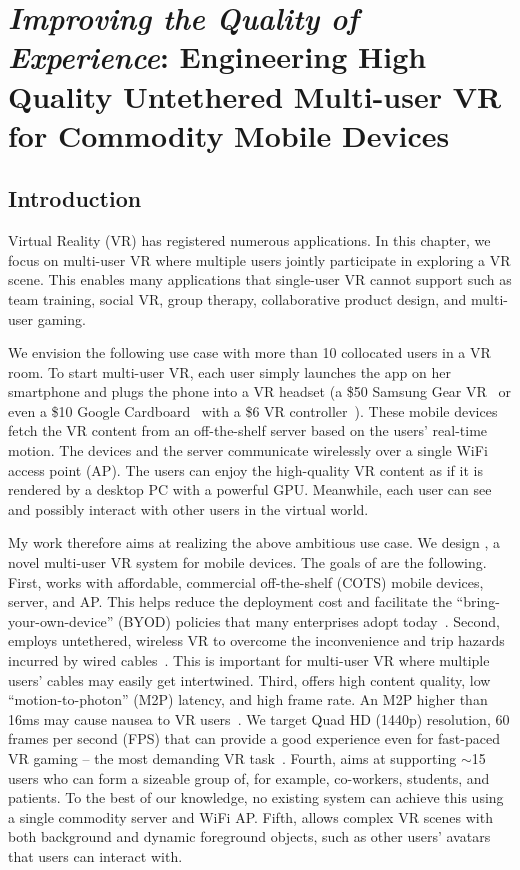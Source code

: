 \chapter{\emph{Improving the Quality of Experience}: Engineering High Quality Untethered Multi-user VR for Commodity Mobile Devices} \label{chap:vr}



\section{Introduction}
Virtual Reality (VR) has registered numerous applications. In
this chapter, we focus on multi-user VR where multiple users
jointly participate in exploring a VR scene. This enables
many applications that single-user VR cannot support such as
team training, social VR, group therapy, collaborative product
design, and multi-user gaming.

We envision the following use case with more than 10 collocated users in a VR room. To start multi-user VR, each user simply launches the app on her smartphone and plugs the phone into a VR headset (\eg a \$50 Samsung Gear VR~\cite{samsung-gear-vr} or even a \$10 Google Cardboard~\cite{google-cardboard} with a \$6 VR controller~\cite{vr-controller}).
These mobile devices fetch the VR content from an off-the-shelf server based on the users' real-time motion. The devices and the server communicate wirelessly over a single WiFi access point (AP). The users can enjoy the high-quality VR content as if it is rendered by a desktop PC with a powerful GPU. Meanwhile, each user can see and possibly interact with other users in the virtual world.

My work therefore aims at realizing the above ambitious use case. We design \firefly, a novel multi-user VR system for mobile devices. The  goals of \firefly are the following.
First, \firefly works with affordable, commercial off-the-shelf (COTS) mobile devices, server, and AP. This helps reduce the deployment cost and facilitate the ``bring-your-own-device'' (BYOD) policies that many enterprises adopt today~\cite{byodref}.
Second, \firefly employs untethered, wireless VR to overcome the inconvenience and trip hazards incurred by wired cables~\cite{triphazard}. This is important for multi-user VR where multiple users' cables may easily get intertwined.
Third, \firefly offers high content quality, low ``motion-to-photon'' (M2P) latency, and high frame rate. An M2P higher than 16ms may cause nausea to VR users~\cite{motionsickness}. We target Quad HD (1440p) resolution, 60 frames per second (FPS) that can provide a good experience even for fast-paced VR gaming -- the most demanding VR task~\cite{vr_gaming}.
Fourth, \firefly aims at supporting $\sim$15 users who can form a sizeable group of, for example, co-workers, students, and patients. To the best of our knowledge, no existing system can achieve this using a single commodity server and WiFi AP. 
Fifth, \firefly allows complex VR scenes with both background and dynamic foreground objects, such as other users' avatars that users can interact with.

